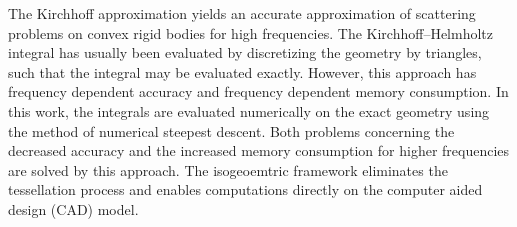 The Kirchhoff approximation yields an accurate approximation of scattering problems on convex rigid bodies for high frequencies. The Kirchhoff--Helmholtz integral has usually been evaluated by discretizing the geometry by triangles, such that the integral may be evaluated exactly. However, this approach has frequency dependent accuracy and frequency dependent memory consumption. In this work, the integrals are evaluated numerically on the exact geometry using the method of numerical steepest descent. Both problems concerning the decreased accuracy and the increased memory consumption for higher frequencies are solved by this approach. The isogeoemtric framework eliminates the tessellation process and enables computations directly on the computer aided design (CAD) model.
